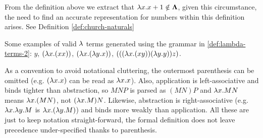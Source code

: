 \documentclass[12pt]{book}
\begin{document}
\begin{remark}
  From the definition above we extract that \( \lambda x . x + 1 \notin \mathbf{\Lambda} \), given this circumstance, the need to find an accurate representation for numbers within this definition arises. See Definition \ref{def:church-naturals}
\end{remark}
\begin{example} Some examples of valid $\lambda$ terms generated using the grammar in \ref{def:lambda-terms-2}:
  \( y \),
  \( (\lambda x. (x x)) \),
  \( (\lambda x. (\lambda y. x)) \),
  \( (((\lambda x. (x y)) (\lambda y. y)) z) \).
\end{example}
As a convention to avoid notational cluttering, the outermost parenthesis can be omitted (e.g. $ ( \lambda x.x ) $ can be read as $ \lambda x.x $). Also, application is left-associative  and binds tighter than abstraction, so $M N P$ is parsed as $(M N) P$ and $\lambda x . M N$ means $\lambda x . (M N)$, not $(\lambda x . M) N$. Likewise, abstraction is right-associative (e.g. $\lambda x . \lambda y . M$ is $\lambda x . (\lambda y . M)$) and binds more weakly than application. All these are just to keep notation straight-forward, the formal definition does not leave precedence under-specified thanks to parenthesis.
\end{document}
